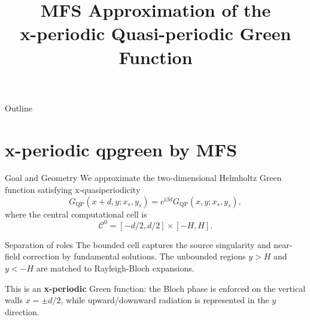 \documentclass[aspectratio=169]{beamer}
\title[x-periodic qpgreen MFS]{MFS Approximation of the\\x-periodic Quasi-periodic Green Function}
\author{}
\date{}
\newcommand{\ii}{\mathrm{i}}
\newcommand{\Czero}{\mathcal C^0}
\newcommand{\Gqp}{G_{\mathrm{QP}}}
\begin{document}
\begin{frame}
  \titlepage
\end{frame}

\begin{frame}{Outline}
  \tableofcontents
\end{frame}

\section{x-periodic qpgreen by MFS}

\begin{frame}{Goal and Geometry}
  \small
  We approximate the two-dimensional Helmholtz Green function satisfying
  x-quasiperiodicity
  \[
    \Gqp(x+d,y;x_s,y_s)
    =
    e^{\ii\beta d}\Gqp(x,y;x_s,y_s),
  \]
  where the central computational cell is
  \[
    \Czero=[-d/2,d/2]\times[-H,H].
  \]

  \begin{block}{Separation of roles}
    The bounded cell captures the source singularity and near-field
    correction by fundamental solutions.  The unbounded regions
    \(y>H\) and \(y<-H\) are matched to Rayleigh-Bloch expansions.
  \end{block}

  \vspace{0.2em}
  This is an \textbf{x-periodic} Green function: the Bloch phase is enforced
  on the vertical walls \(x=\pm d/2\), while upward/downward radiation is
  represented in the \(y\) direction.
\end{frame}
\end{document}
